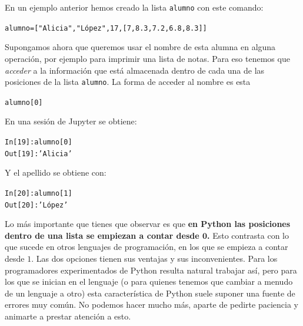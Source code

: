 \documentclass[10pt,a4paper]{article}\usepackage[]{graphicx}\usepackage[]{color}
\makeatletter
\newcommand{\hlnum}[1]{\textcolor[rgb]{0.686,0.059,0.569}{#1}}%
\newcommand{\hlstr}[1]{\textcolor[rgb]{0.192,0.494,0.8}{#1}}%
\newcommand{\hlopt}[1]{\textcolor[rgb]{0,0,0}{#1}}%
\newcommand{\hlstd}[1]{\textcolor[rgb]{0.345,0.345,0.345}{#1}}%
\newenvironment{kframe}{%
 \def\at@end@of@kframe{}%
 \ifinner\ifhmode%
  \def\at@end@of@kframe{\end{minipage}}%
  \begin{minipage}{\columnwidth}%
 \fi\fi%
 \def\FrameCommand##1{\hskip\@totalleftmargin \hskip-\fboxsep
 \colorbox{shadecolor}{##1}\hskip-\fboxsep
     \hskip-\linewidth \hskip-\@totalleftmargin \hskip\columnwidth}%
 \MakeFramed {\advance\hsize-\width
   \@totalleftmargin\z@ \linewidth\hsize
   \@setminipage}}%
 {\par\unskip\endMakeFramed%
 \at@end@of@kframe}
\newenvironment{knitrout}{}{} %
\newcounter {cont01}
\makeatother
\begin{document}
En un ejemplo anterior hemos creado la lista {\tt alumno} con este comando:
\begin{knitrout}
\color{fgcolor}\begin{kframe}
\begin{alltt}
alumno = [\hlstr{"Alicia"}, \hlstr{"López"}, 17, [7, 8.3, 7.2, 6.8, 8.3]]
\end{alltt}
\end{kframe}
\end{knitrout}
Supongamos ahora que queremos usar el nombre de esta alumna en alguna operación, por ejemplo para imprimir una lista de notas. Para eso tenemos que {\em acceder} a la información que está almacenada dentro de cada una de las posiciones de la lista {\tt alumno}. La forma de acceder al nombre es esta
\begin{knitrout}
\color{fgcolor}\begin{kframe}
\begin{alltt}
\hlstd{alumno[}\hlnum{0}\hlstd{]}
\end{alltt}
\end{kframe}
\end{knitrout}
En una sesión de Jupyter se obtiene:
\begin{knitrout}
\color{fgcolor}\begin{kframe}
\begin{alltt}
\hlstd{In [}\hlnum{19}\hlstd{]}\hlopt{:} \hlstd{alumno[}\hlnum{0}\hlstd{]}
\hlstd{Out[}\hlnum{19}\hlstd{]}\hlopt{:} \hlstr{'Alicia'}
\end{alltt}
\end{kframe}
\end{knitrout}
Y el apellido se obtiene con:
\begin{knitrout}
\color{fgcolor}\begin{kframe}
\begin{alltt}
\hlstd{In [}\hlnum{20}\hlstd{]}\hlopt{:} \hlstd{alumno[}\hlnum{1}\hlstd{]}
\hlstd{Out[}\hlnum{20}\hlstd{]}\hlopt{:} \hlstr{'López'}
\end{alltt}
\end{kframe}
\end{knitrout}
Lo más importante que tienes que observar es que {\bf en Python las posiciones dentro de una lista se empiezan a contar desde $\mathbf 0$.} Esto contrasta con lo que sucede en otros lenguajes de programación, en los que se empieza a contar desde $1$. Las dos opciones tienen sus ventajas y sus inconvenientes. Para los programadores experimentados de Python resulta natural trabajar así, pero para los que se inician en el lenguaje (o para quienes tenemos que cambiar a menudo de un lenguaje a otro) esta característica de Python suele suponer una fuente de errores muy común. No podemos hacer mucho más, aparte de pedirte paciencia y animarte a prestar atención a esto.
\end{document}
